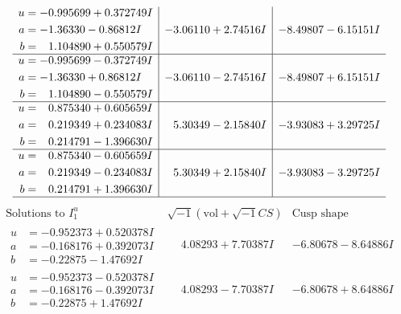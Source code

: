 \documentclass[1p]{elsarticle_modified}
\theoremstyle{definition}
\newcommand{\I}{\sqrt{-1}}
\begin{document}
$$\begin{array}{c|c|c}
\begin{aligned}
u &= -0.995699 + 0.372749 I \\
a &= -1.36330 - 0.86812 I \\
b &= \phantom{-}1.104890 + 0.550579 I\end{aligned}
 & -3.06110 + 2.74516 I & -8.49807 - 6.15151 I \\ \hline\begin{aligned}
u &= -0.995699 - 0.372749 I \\
a &= -1.36330 + 0.86812 I \\
b &= \phantom{-}1.104890 - 0.550579 I\end{aligned}
 & -3.06110 - 2.74516 I & -8.49807 + 6.15151 I \\ \hline\begin{aligned}
u &= \phantom{-}0.875340 + 0.605659 I \\
a &= \phantom{-}0.219349 + 0.234083 I \\
b &= \phantom{-}0.214791 - 1.396630 I\end{aligned}
 & \phantom{-}5.30349 - 2.15840 I & -3.93083 + 3.29725 I \\ \hline\begin{aligned}
u &= \phantom{-}0.875340 - 0.605659 I \\
a &= \phantom{-}0.219349 - 0.234083 I \\
b &= \phantom{-}0.214791 + 1.396630 I\end{aligned}
 & \phantom{-}5.30349 + 2.15840 I & -3.93083 - 3.29725 I\\
 \hline 
 \end{array}$$\newpage$$\begin{array}{c|c|c}  
\text{Solutions to }I^u_{1}& \I (\text{vol} + \sqrt{-1}CS) & \text{Cusp shape}\\
 \hline 
\begin{aligned}
u &= -0.952373 + 0.520378 I \\
a &= -0.168176 + 0.392073 I \\
b &= -0.22875 - 1.47692 I\end{aligned}
 & \phantom{-}4.08293 + 7.70387 I & -6.80678 - 8.64886 I \\ \hline\begin{aligned}
u &= -0.952373 - 0.520378 I \\
a &= -0.168176 - 0.392073 I \\
b &= -0.22875 + 1.47692 I\end{aligned}
 & \phantom{-}4.08293 - 7.70387 I & -6.80678 + 8.64886 I \\ \hline\begin{aligned}

\end{aligned}
\end{array}$$
\end{document}
